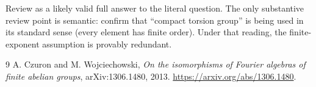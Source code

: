 \documentclass[11pt]{article}
\begin{document}
Review as a likely valid full answer to the literal question.  The only
substantive review point is semantic: confirm that ``compact torsion group''
is being used in its standard sense (every element has finite order).  Under
that reading, the finite-exponent assumption is provably redundant.

\begin{thebibliography}{9}
A. Czuron and M. Wojciechowski,
\emph{On the isomorphisms of Fourier algebras of finite abelian groups},
arXiv:1306.1480, 2013.
\url{https://arxiv.org/abs/1306.1480}.
\end{thebibliography}
\end{document}

